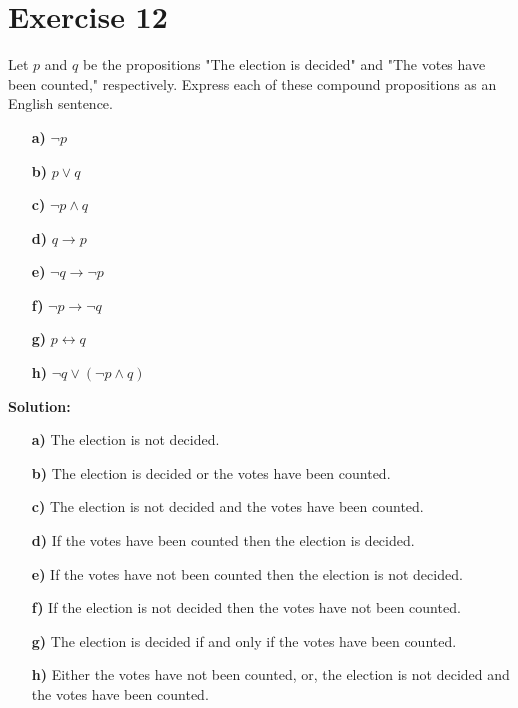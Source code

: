 \documentclass{Axon}
\begin{document}
\section*{Exercise 12}
Let \(p\) and \(q\) be the propositions "The election is decided" and "The votes have been counted," respectively. Express each of these compound propositions as an English sentence.
\begin{enumerate}
    \item[\textbf{a)}] \(\lnot p\)
    \item[\textbf{b)}] \(p \lor q\)
    \item[\textbf{c)}] \(\lnot p \land q\)
    \item[\textbf{d)}] \(q \to p\)
    \item[\textbf{e)}] \(\lnot q \to \lnot p\)
    \item[\textbf{f)}] \(\lnot p \to \lnot q\)
    \item[\textbf{g)}] \(p \leftrightarrow q\)
    \item[\textbf{h)}] \(\lnot q \lor (\lnot p \land q)\)
\end{enumerate}

\noindent
\textbf{Solution:}
\begin{enumerate}
    \item[\textbf{a)}] The election is not decided.
    \item[\textbf{b)}] The election is decided or the votes have been counted.
    \item[\textbf{c)}] The election is not decided and the votes have been counted.
    \item[\textbf{d)}] If the votes have been counted then the election is decided.
    \item[\textbf{e)}] If the votes have not been counted then the election is not decided.
    \item[\textbf{f)}] If the election is not decided then the votes have not been counted.
    \item[\textbf{g)}] The election is decided if and only if the votes have been counted.
    \item[\textbf{h)}] Either the votes have not been counted, or, the election is not decided and the votes have been counted.
\end{enumerate}
\end{document}
